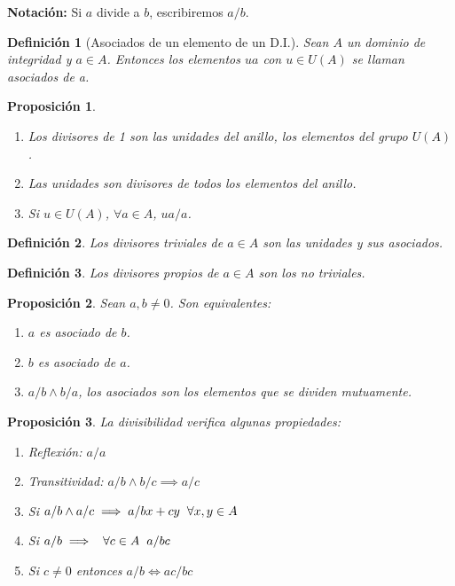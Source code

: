 \documentclass[11pt, a4paper, titlepage]{article}
\newif\IfInSansMode
\theoremstyle{theorem-style}
\newtheorem{nprop}{Proposición}[section]
\theoremstyle{definition-style}
\newtheorem{ndef}{Definición}[section]
\theoremstyle{remark-style}
\theoremstyle{example-style}
\newenvironment{nlist}
{\begin{enumerate}
\renewcommand\labelenumi{(\emph{\roman{enumi})}}}
{\end{enumerate}}
\begin{document}
\textbf{Notación:} Si $a$ divide a $b$, escribiremos $a/b$.

\begin{ndef}[Asociados de un elemento de un D.I.]
  Sean $A$ un dominio de integridad y $a\in A$. Entonces los elementos $ua$ con $u\in U(A)$ se llaman \emph{asociados de a}.
\end{ndef}

\begin{nprop}\hfill
  \begin{nlist}
  \item Los divisores de 1 son las unidades del anillo, los elementos del grupo $U(A)$.
  \item Las unidades son divisores de todos los elementos del anillo.
  \item Si $u\in U(A)$, $\forall a \in A$, $ua/a$.

  \end{nlist}
\end{nprop}

\begin{ndef}
	Los divisores triviales de $a \in A$ son las unidades y sus asociados.
\end{ndef}

\begin{ndef}
  Los divisores propios de $a \in A$ son los no triviales.
\end{ndef}

\begin{nprop}
	Sean $a,b\neq 0$. Son equivalentes:
	\begin{nlist}
	\item $a$ es asociado de $b$.
	\item $b$ es asociado de $a$.
	\item $a/b \wedge b/a$, los asociados son los elementos que se dividen mutuamente.

\end{nlist}
\end{nprop}

\begin{nprop} La divisibilidad verifica algunas propiedades:

  \begin{nlist}
  \item Reflexión: $a/a$
  \item Transitividad: $a/b \wedge b/c \implies a/c$
  \item Si $a/b \wedge a/c \implies a/bx +cy\hspace{0.2cm} \forall x,y \in A$
  \item Si $a/b \implies \hspace{0.2cm} \forall c\in A \hspace{0.2cm} a/bc$
  \item Si $c\neq 0$ entonces $a/b \iff ac/bc$
  \end{nlist}
\end{nprop}
\end{document}
